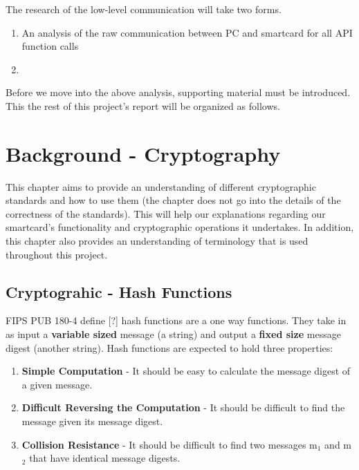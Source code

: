 \documentclass[bsc,frontabs,twoside,singlespacing,parskip,deptreport]{infthesis}     %
\begin{document}
The research of the low-level communication will take two forms. 
\begin{enumerate}
\item An analysis of the raw communication between PC and smartcard for all API function calls
\item 
\end{enumerate}


Before we move into the above analysis, supporting material must be introduced. This the rest of this project's report will be organized as follows.



\chapter{Background - Cryptography}

This chapter aims to provide an understanding of different cryptographic standards and how to use them (the chapter does not go into the details of the correctness of the standards). This will help our explanations regarding our smartcard's functionality and cryptographic operations it undertakes. In addition, this chapter also provides an understanding of terminology that is used throughout this project.

\section{Cryptograhic - Hash Functions}

FIPS PUB 180-4 define [?] hash functions are a one way functions. They take in as input a \textbf{variable sized} message (a string) and output a \textbf{fixed size} message digest (another string). Hash functions are expected to hold three properties:
\begin{enumerate}
\item \textbf{Simple Computation} - It should be easy to calculate the message digest of a given message.
\item \textbf{Difficult Reversing the Computation} - It should be difficult to find the message given its message digest.
\item \textbf{Collision Resistance} - It should be difficult to find two messages m$_1$ and m$_2$ that have identical message digests.
\end{enumerate}
\end{document}

